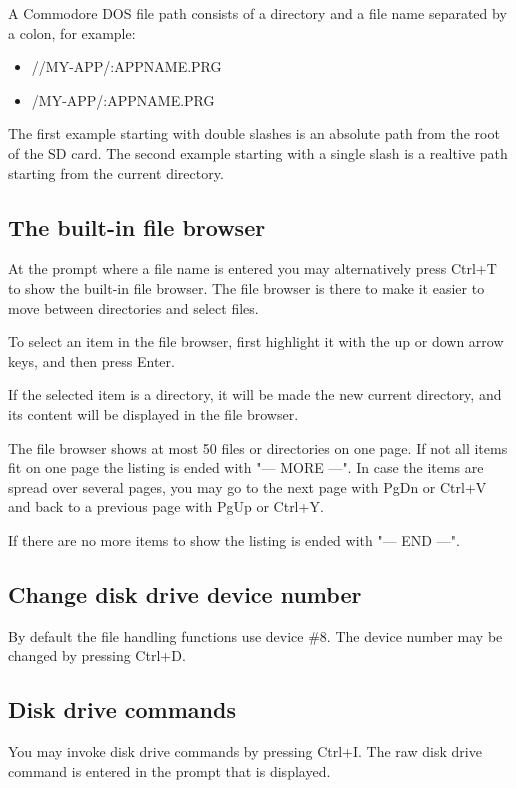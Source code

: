 \documentclass{article}
\begin{document}
    A Commodore DOS file path consists of a directory and a file name separated by a colon, for
    example:

    \begin{itemize}
        \item //MY-APP/:APPNAME.PRG
        \item /MY-APP/:APPNAME.PRG
    \end{itemize}
    
    The first example starting with double slashes is an absolute path from the root of the SD card. The second
    example starting with a single slash is a realtive path starting from the current directory.

    \subsection{The built-in file browser}
        At the prompt where a file name is entered you may alternatively press Ctrl+T to show the
        built-in file browser. The file browser is there to make it easier to move between directories 
        and select files.
        
        To select an item in the file browser, first highlight it with the up or down arrow keys, and then press Enter.

        If the selected item is a directory, it will be made the new current directory, and its content will
        be displayed in the file browser.

        The file browser shows at most 50 files or directories on one page. If not all items fit on one page 
        the listing is ended with "--- MORE ---". In case the items are spread over several pages, you may go to 
        the next page with PgDn or Ctrl+V and back to a previous page with PgUp or Ctrl+Y.

        If there are no more items to show the listing is ended with "--- END ---".

    \subsection{Change disk drive device number}
        By default the file handling functions use device \#8. The device
        number may be changed by pressing Ctrl+D.

    \subsection{Disk drive commands}
        You may invoke disk drive commands by pressing Ctrl+I. The raw disk drive command
        is entered in the prompt that is displayed.
\end{document}

